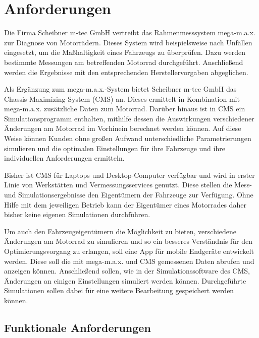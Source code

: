\chapter{Anforderungen}
\label{chap:anf}
	
	Die Firma Scheibner m-tec GmbH vertreibt das Rahmenmesssystem mega-m.a.x. zur Diagnose von Motorrädern. Dieses System wird beispielsweise nach Unfällen eingesetzt, um die Maßhaltigkeit eines Fahrzeugs zu überprüfen. Dazu werden bestimmte Messungen am betreffenden Motorrad durchgeführt. Anschließend werden die Ergebnisse mit den entsprechenden Herstellervorgaben abgeglichen.
	
	Als Ergänzung zum mega-m.a.x.-System bietet Scheibner m-tec GmbH das Chassis-Maximizing-System (CMS) an. Dieses ermittelt in Kombination mit mega-m.a.x. zusätzliche Daten zum Motorrad. Darüber hinaus ist in CMS ein Simulationsprogramm enthalten, mithilfe dessen die Auswirkungen verschiedener Änderungen am Motorrad im Vorhinein berechnet werden können. Auf diese Weise können Kunden ohne großen Aufwand unterschiedliche Parametrierungen simulieren und die optimalen Einstellungen für ihre Fahrzeuge und ihre individuellen Anforderungen ermitteln.
	
	Bisher ist CMS für Laptops und Desktop-Computer verfügbar und wird in erster Linie von Werkstätten und Vermessungsservices genutzt. Diese stellen die Mess- und Simulationsergebnisse den Eigentümern der Fahrzeuge zur Verfügung. Ohne Hilfe mit dem jeweiligen Betrieb kann der Eigentümer eines Motorrades daher bisher keine eigenen Simulationen durchführen.
	
	Um auch den Fahrzeugeigentümern die Möglichkeit zu bieten, verschiedene Änderungen am Motorrad zu simulieren und so ein besseres Verständnis für den Optimierungsvorgang zu erlangen, soll eine App für mobile Endgeräte entwickelt werden. Diese soll die mit mega-m.a.x. und CMS gemessenen Daten abrufen und anzeigen können. Anschließend sollen, wie in der Simulationssoftware des CMS, Änderungen an einigen Einstellungen simuliert werden können. Durchgeführte Simulationen sollen dabei für eine weitere Bearbeitung gespeichert werden können.

	\section{Funktionale Anforderungen}
	\label{sec:funktionale-anf}
	
